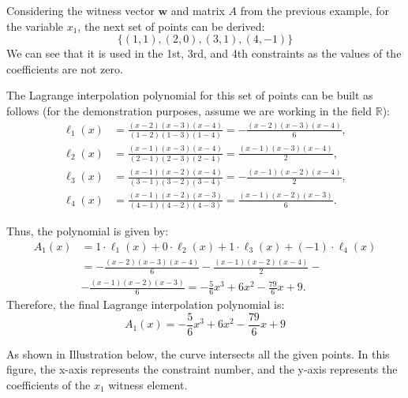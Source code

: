 \documentclass[../lecture-notes-148x210.tex]{subfiles}
\begin{document}
\begin{example}
    Considering the witness vector $\mathbf{w}$ and matrix $A$ from the previous example, for the variable
    $x_1$, the next set of points can be derived:
    \begin{equation*}
        \{(1,1), (2,0), (3,1), (4,-1)\}
    \end{equation*}
    We can see that it is used in the 1st, 3rd, and 4th constraints as the values of the coefficients
    are not zero.
    
    The Lagrange interpolation polynomial for this set of points can be built as follows (for the demonstration purposes, assume we are working in the field $\mathbb{R}$):
    \begin{align*}
        \ell_1(x) &= \frac{(x - 2)(x - 3)(x - 4)}{(1 - 2)(1 - 3)(1 - 4)} = -\frac{(x - 2)(x - 3)(x - 4)}{6}, \\
        \ell_2(x) &= \frac{(x - 1)(x - 3)(x - 4)}{(2 - 1)(2 - 3)(2 - 4)} = \frac{(x - 1)(x - 3)(x - 4)}{2}, \\
        \ell_3(x) &= \frac{(x - 1)(x - 2)(x - 4)}{(3 - 1)(3 - 2)(3 - 4)} = -\frac{(x - 1)(x - 2)(x - 4)}{2}, \\
        \ell_4(x) &= \frac{(x - 1)(x - 2)(x - 3)}{(4 - 1)(4 - 2)(4 - 3)} = \frac{(x - 1)(x - 2)(x - 3)}{6}.
    \end{align*}

    Thus, the polynomial is given by:
    \begin{equation*}
        \begin{aligned}
            A_1(x) &= 1 \cdot \ell_1(x) + 0 \cdot \ell_2(x) + 1 \cdot \ell_3(x) + (-1) \cdot \ell_4(x) \\
            &= -\frac{(x - 2)(x - 3)(x - 4)}{6} - \frac{(x - 1)(x - 2)(x - 4)}{2} - \\ 
            &- \frac{(x - 1)(x - 2)(x - 3)}{6} = -\frac{5}{6}x^3 + 6x^2 - \frac{79}{6}x + 9.
        \end{aligned}
    \end{equation*}
    Therefore, the final Lagrange interpolation polynomial is:
    \begin{equation*}
        A_1(x) = -\frac{5}{6}x^3 + 6x^2 - \frac{79}{6}x + 9
    \end{equation*}

    As shown in Illustration below, the curve intersects all the given points.
    In this figure, the x-axis represents the constraint number, and the y-axis represents the 
    coefficients of the $x_1$ witness element.


\end{example}
\end{document}
